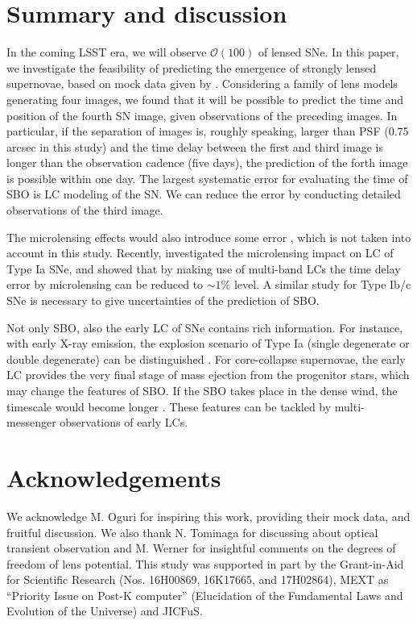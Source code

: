 \documentclass[useAMS,usenatbib,twocolumn]{mnras}
\begin{document}
\section{Summary and discussion}
\label{sec:summary}

In the coming LSST era, we will observe $\mathcal{O}(100)$ of lensed
SNe. In this paper, we investigate the feasibility of predicting the
emergence of strongly lensed supernovae, based on mock data given by
\cite{ogur10}. Considering a family of lens models generating four
images, we found that it will be possible to predict the time and
position of the fourth SN image, given observations of the preceding
images.  In particular, if the separation of images is, roughly
speaking, larger than PSF (0.75 arcsec in this study) and the time
delay between the first and third image is longer than the observation
cadence (five days), the prediction of the forth image is possible
within one day.  The largest systematic error for evaluating the time
of SBO is LC modeling of the SN. We can reduce the error by conducting
detailed observations of the third image.

The microlensing effects would also introduce some error
\citep{dobl06}, which is not taken into account in this study.
Recently, \cite{gold17b} investigated the microlensing impact on LC of
Type Ia SNe, and showed that by making use of multi-band LCs the time
delay error by microlensing can be reduced to $\sim 1\%$ level.  A
similar study for Type Ib/c SNe is necessary to give uncertainties of
the prediction of SBO.

Not only SBO, also the early LC of SNe contains rich information. For
instance, with early X-ray emission, the explosion scenario of Type Ia
(single degenerate or double degenerate) can be distinguished
\citep{kase10b}. For core-collapse supernovae, the early LC provides
the very final stage of mass ejection from the progenitor stars, which
may change the features of SBO. If the SBO takes place in the dense
wind, the timescale would become longer \citep{tana16}. These features
can be tackled by multi-messenger observations of early LCs.

\section*{Acknowledgements}

We acknowledge M. Oguri for inspiring this work, providing their mock
data, and fruitful discussion. We also thank N. Tominaga for
discussing about optical transient observation and M. Werner for
insightful comments on the degrees of freedom of lens potential. This
study was supported in part by the Grant-in-Aid for Scientific
Research (Nos. 16H00869, 16K17665, and 17H02864), MEXT as ``Priority
Issue on Post-K computer'' (Elucidation of the Fundamental Laws and
Evolution of the Universe) and JICFuS.
\end{document}
